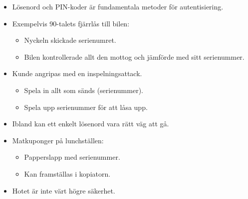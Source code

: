 \begin{frame}
  \begin{itemize}
    \item Lösenord och PIN-koder är fundamentala metoder för autentisiering.

      \pause{}

    \item Exempelvis 90-talets fjärrlås till bilen:
      \begin{itemize}
        \item Nyckeln skickade serienumret.
        \item Bilen kontrollerade allt den mottog och jämförde med sitt 
          serienummer.
      \end{itemize}

      \pause{}

    \item Kunde angripas med en inspelningsattack.
      \begin{itemize}
        \item Spela in allt som sänds (serienummer).
        \item Spela upp serienummer för att låsa upp.
      \end{itemize}

  \end{itemize}
\end{frame}

\begin{frame}
  \begin{itemize}
    \item Ibland kan ett enkelt lösenord vara rätt väg att gå.

    \item Matkuponger på lunchställen:
      \begin{itemize}
        \item Papperslapp med serienummer.
        \item Kan framställas i kopiatorn.
      \end{itemize}

      \pause{}

    \item Hotet är inte värt högre säkerhet.

  \end{itemize}
\end{frame}



\begin{frame}
	\small
  \printbibliography{}
\end{frame}

